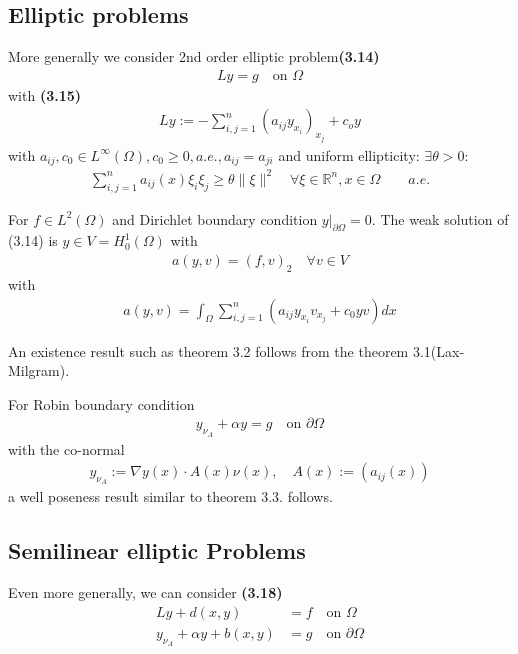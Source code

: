 \subsection{Elliptic problems}
More generally we consider 2nd order elliptic problem\textbf{(3.14)}
\begin{align*}
	Ly = g \quad \text{on } \Omega
\end{align*}
with \textbf{(3.15)}
\begin{align*}
	Ly := - \sum_{i, j= 1}^n (a_{ij} y_{x_i})_{x_j} + c_o y 
\end{align*}
with $a_{ij}, c_0 \in L^\infty(\Omega), c_0 \ge 0, a.e., a_{ij} = a_{ji}$
and uniform ellipticity: $\exists \theta > 0$:
\begin{align*}
	\sum_{i, j = 1}^n a_{ij} (x) \xi_i \xi_j \ge \theta \|\xi\|^2 \quad \forall \xi \in \mathbb{R}^n, x \in \Omega \qquad a.e.
\end{align*}

For $f \in L^2(\Omega)$ and Dirichlet boundary condition $y|_{\partial \Omega} = 0$. The weak solution of (3.14) is $y \in V = H^1_0(\Omega)$ with 
\begin{align*}
	a(y, v) = (f, v)_2 \quad \forall v \in V
\end{align*}
with 
\begin{align*}
	a(y, v) = \int_\Omega \sum_{i, j =1}^n (a_{ij}y_{x_i} v_{x_j} + c_0 yv)dx
\end{align*}

An existence result such as theorem 3.2 follows from the theorem 3.1(Lax-Milgram). \par 
For Robin boundary condition
\begin{align*}
	y_{\nu_A} + \alpha y = g \quad \text{on } \partial \Omega
\end{align*}
with the co-normal
\begin{align*}
	y_{\nu_A} := \nabla y(x) \cdot A(x) \nu(x), \quad A(x) := (a_{ij}(x))
\end{align*}
a well poseness result similar to theorem 3.3. follows. 


\subsection{Semilinear elliptic Problems}
Even more generally, we can consider \textbf{(3.18)}
\begin{align*}
	Ly + d(x, y) &= f \quad \text{on }\Omega\\
	y_{\nu_A} + \alpha y + b(x, y) &= g \quad \text{on } \partial \Omega
\end{align*}

